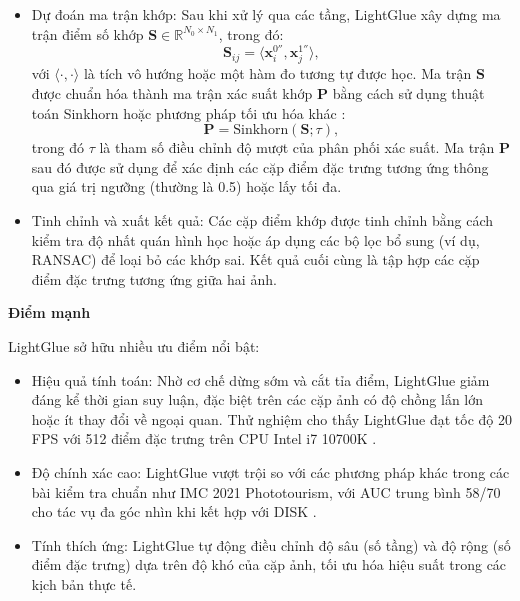 \begin{itemize}
    \item Dự đoán ma trận khớp: 
    Sau khi xử lý qua các tầng, LightGlue xây dựng ma trận điểm số khớp $\mathbf{S} \in \mathbb{R}^{N_0 \times N_1}$, trong đó:
    \begin{equation}
        \mathbf{S}_{ij} = \langle \mathbf{x}_i^{0''}, \mathbf{x}_j^{1''} \rangle,
    \end{equation}
    với $\langle \cdot, \cdot \rangle$ là tích vô hướng hoặc một hàm đo tương tự được học. Ma trận $\mathbf{S}$ được chuẩn hóa thành ma trận xác suất khớp $\mathbf{P}$ bằng cách sử dụng thuật toán Sinkhorn hoặc phương pháp tối ưu hóa khác \cite{lindenberger2023LightGlue}:
    \begin{equation}
        \mathbf{P} = \text{Sinkhorn}(\mathbf{S}; \tau),
    \end{equation}
    trong đó $\tau$ là tham số điều chỉnh độ mượt của phân phối xác suất. Ma trận $\mathbf{P}$ sau đó được sử dụng để xác định các cặp điểm đặc trưng tương ứng thông qua giá trị ngưỡng (thường là 0.5) hoặc lấy tối đa.

    
    \item Tinh chỉnh và xuất kết quả: 
    Các cặp điểm khớp được tinh chỉnh bằng cách kiểm tra độ nhất quán hình học hoặc áp dụng các bộ lọc bổ sung (ví dụ, RANSAC) để loại bỏ các khớp sai. Kết quả cuối cùng là tập hợp các cặp điểm đặc trưng tương ứng giữa hai ảnh.
\end{itemize}

\textbf{Điểm mạnh}

LightGlue sở hữu nhiều ưu điểm nổi bật:

\begin{itemize}
    \item Hiệu quả tính toán: Nhờ cơ chế dừng sớm và cắt tỉa điểm, LightGlue giảm đáng kể thời gian suy luận, đặc biệt trên các cặp ảnh có độ chồng lấn lớn hoặc ít thay đổi về ngoại quan. Thử nghiệm cho thấy LightGlue đạt tốc độ 20 FPS với 512 điểm đặc trưng trên CPU Intel i7 10700K \cite{lindenberger2023LightGlue}.
    \item Độ chính xác cao: LightGlue vượt trội so với các phương pháp khác trong các bài kiểm tra chuẩn như IMC 2021 Phototourism, với AUC trung bình 58/70 cho tác vụ đa góc nhìn khi kết hợp với DISK \cite{lindenberger2023LightGlue}.
    \item Tính thích ứng: LightGlue tự động điều chỉnh độ sâu (số tầng) và độ rộng (số điểm đặc trưng) dựa trên độ khó của cặp ảnh, tối ưu hóa hiệu suất trong các kịch bản thực tế.
\end{itemize}

